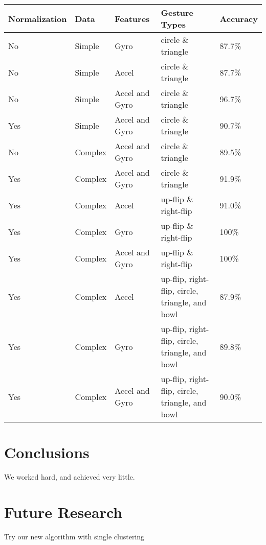 \documentclass[12pt]{article}
\begin{document}
\begin{center}
\begin{tabular}{ | l | l | l | l | l | }
  \hline
  Normalization & Data & Features & Gesture Types & Accuracy \\ \hline
  No	&	Simple	&	Gyro	&	circle \& triangle	&	87.7\% \\ \hline
  No	&	Simple	&	Accel	&	circle \& triangle	&	87.7\% \\ \hline
  No	&	Simple	&	Accel and Gyro	&	circle \& triangle	&	96.7\% \\ \hline
  Yes	&	Simple	&	Accel and Gyro	&	circle \& triangle	&	90.7\% \\ \hline
  No	&	Complex	&	Accel and Gyro	&	circle \& triangle	&	89.5\% \\ \hline
  Yes	&	Complex	&	Accel and Gyro	&	circle \& triangle	&	91.9\% \\ \hline
  Yes	&	Complex	&	Accel	&	up-flip \& right-flip	&	91.0\% \\ \hline
  Yes	&	Complex	&	Gyro	&	up-flip \& right-flip	&	100\% \\ \hline
  Yes	&	Complex	&	Accel and Gyro	&	up-flip \& right-flip	&	100\% \\ \hline
  Yes	&	Complex	&	Accel	&	up-flip, right-flip, circle, triangle, and bowl	&	87.9\% \\ \hline
  Yes	&	Complex	&	Gyro	&	up-flip, right-flip, circle, triangle, and bowl	&	89.8\% \\ \hline
  Yes	&	Complex	&	Accel and Gyro	&	up-flip, right-flip, circle, triangle, and bowl	&	90.0\% \\
  \hline
\end{tabular}
\end{center}

\section{Conclusions}\label{conclusions}
We worked hard, and achieved very little.

\section{Future Research}
Try our new algorithm with single clustering



\end{document}
